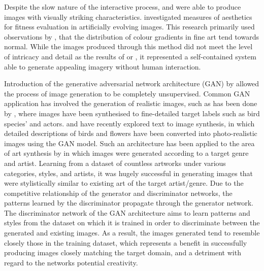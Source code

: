 \documentclass{article}
\begin{document}
Despite the slow nature of the interactive process, \citet{sims} and \citet{nevar} were able to produce images with visually striking characteristics.
\citet{aesthetic-measures} investigated measures of aesthetics for fitness evaluation in artificially evolving images.
This research primarily used observations by \citet{ralph-bell-curve}, that the distribution of colour gradients in fine art tend towards normal.
While the images produced through this method did not meet the level of intricacy and detail as the results of \citet{sims} or \citet{nevar}, it represented a self-contained system able to generate appealing imagery without human interaction.

Introduction of the generative adversarial network architecture (GAN) by \citet{GAN} allowed the process of image generation to be completely unsupervised.
Common GAN application has involved the generation of realistic images, such as has been done by \citet{bao2017cvae}, where images have been synthesised to fine-detailed target labels such as bird species' and actors.
\citet{zhang2017stackgan} and \citet{reed2016generative} have recently explored text to image synthesis, in which detailed descriptions of birds and flowers have been converted into photo-realistic images using the GAN model.
Such an architecture has been applied to the area of art synthesis by \citet{tan2017artgan} in which images were generated according to a target genre and artist.
Learning from a dataset of countless artworks under various categories, styles, and artists, it was hugely successful in generating images that were stylistically similar to existing art of the target artist/genre.
Due to the competitive relationship of the generator and discriminator networks, the patterns learned by the discriminator propagate through the generator network.
The discriminator network of the GAN architecture aims to learn patterns and styles from the dataset on which it is trained in order to discriminate between the generated and existing images.
As a result, the images generated tend to resemble closely those in the training dataset, which represents a benefit in successfully producing images closely matching the target domain, and a detriment with regard to the networks potential creativity.
\end{document}
